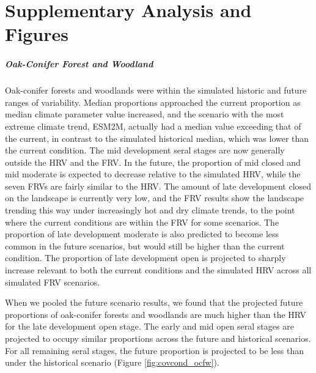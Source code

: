 \appendix

\chapter{Supplementary Analysis and Figures}
\label{app:futurecovcond}

\paragraph{Oak-Conifer Forest and Woodland} Oak-conifer forests and woodlands were within the simulated historic and future ranges of variability. Median proportions approached the current proportion as median climate parameter value increased, and the scenario with the most extreme climate trend, ESM2M, actually had a median value exceeding that of the current, in contrast to the simulated historical median, which was lower than the current condition. The mid development seral stages are now generally outside the HRV and the FRV. In the future, the proportion of mid closed and mid moderate is expected to decrease relative to the simulated HRV, while the seven FRVs are fairly similar to the HRV. The amount of late development closed on the landscape is currently very low, and the FRV results show the landscape trending this way under increasingly hot and dry climate trends, to the point where the current conditions are within the FRV for some scenarios. The proportion of late development moderate is also predicted to become less common in the future scenarios, but would still be higher than the current condition. The proportion of late development open is projected to sharply increase relevant to both the current conditions and the simulated HRV across all simulated FRV scenarios.

When we pooled the future scenario results, we found that the projected future proportions of oak-conifer forests and woodlands are much higher than the HRV for the late development open stage. The early and mid open seral stages are projected to occupy similar proportions across the future and historical scenarios. For all remaining seral stages, the future proportion is projected to be less than under the historical scenario (Figure \ref{fig:covcond_ocfw}).

